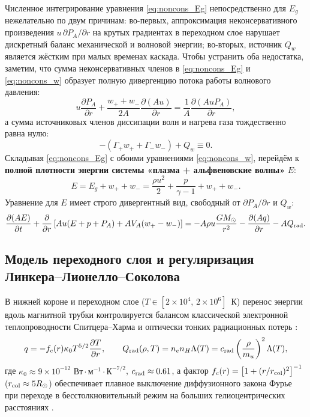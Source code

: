 \documentclass[11pt,a4paper]{article}
\begin{document}
Численное интегрирование уравнения \eqref{eq:noncons_Eg} непосредственно для $E_g$ нежелательно по двум причинам: во-первых, аппроксимация неконсервативного произведения $u\,\partial P_A/\partial r$ на крутых градиентах в переходном слое нарушает дискретный баланс механической и волновой энергии; во-вторых, источник $Q_w$ является жёстким при малых временах каскада. Чтобы устранить оба недостатка, заметим, что сумма неконсервативных членов в \eqref{eq:noncons_Eg} и \eqref{eq:noncons_w} образует полную дивергенцию потока работы волнового давления:
\[
u\frac{\partial P_A}{\partial r} + \frac{w_+ + w_-}{2A}\frac{\partial(Au)}{\partial r} = \frac{1}{A}\frac{\partial(A u P_A)}{\partial r},
\]
а сумма источниковых членов диссипации волн и нагрева газа тождественно равна нулю:
\[
-(\Gamma_+ w_+ + \Gamma_- w_-) + Q_w \equiv 0.
\]
Складывая \eqref{eq:noncons_Eg} с обоими уравнениями \eqref{eq:noncons_w}, перейдём к \textbf{полной плотности энергии системы «плазма + альфвеновские волны»} $E$:
\begin{equation}
E = E_g + w_+ + w_- = \frac{\rho u^2}{2} + \frac{p}{\gamma-1} + w_+ + w_-.
\label{eq:total_energy_def}
\end{equation}
Уравнение для $E$ имеет строго дивергентный вид, свободный от $\partial P_A/\partial r$ и $Q_w$:
\begin{equation}
\frac{\partial(A E)}{\partial t} + \frac{\partial}{\partial r}\left[A u(E + p + P_A) + A V_A(w_+ - w_-)\right] = -A\rho u\frac{GM_\odot}{r^2} - \frac{\partial(A q)}{\partial r} - A Q_{\rm rad}.
\label{eq:total_energy_eq_1d}
\end{equation}

\subsection{Модель переходного слоя и регуляризация Линкера--Лионелло--Соколова}

В нижней короне и переходном слое ($T \in [2\times 10^4,\, 2\times 10^6]$~К) перенос энергии вдоль магнитной трубки контролируется балансом классической электронной теплопроводности Спитцера--Харма \cite{SpitzerHarm1953} и оптически тонких радиационных потерь \cite{Rosner1978,Klimchuk2008}:
\begin{equation}
q = -f_c(r)\kappa_0 T^{5/2}\frac{\partial T}{\partial r}, \qquad
Q_{\rm rad}(\rho, T) = n_e n_H \Lambda(T) = c_{\rm rad}\left(\frac{\rho}{m_u}\right)^2\Lambda(T),
\label{eq:tr_physics_raw}
\end{equation}
где $\kappa_0 \approx 9\times 10^{-12}\text{ Вт}\cdot\text{м}^{-1}\cdot\text{К}^{-7/2}$, $c_{\rm rad} \approx 0.61$, а фактор $f_c(r) = \left[1 + (r/r_{\rm col})^2\right]^{-1}$ ($r_{\rm col} \approx 5 R_\odot$) обеспечивает плавное выключение диффузионного закона Фурье при переходе в бесстолкновительный режим на больших гелиоцентрических расстояниях \cite{Hollweg1978}.
\end{document}
